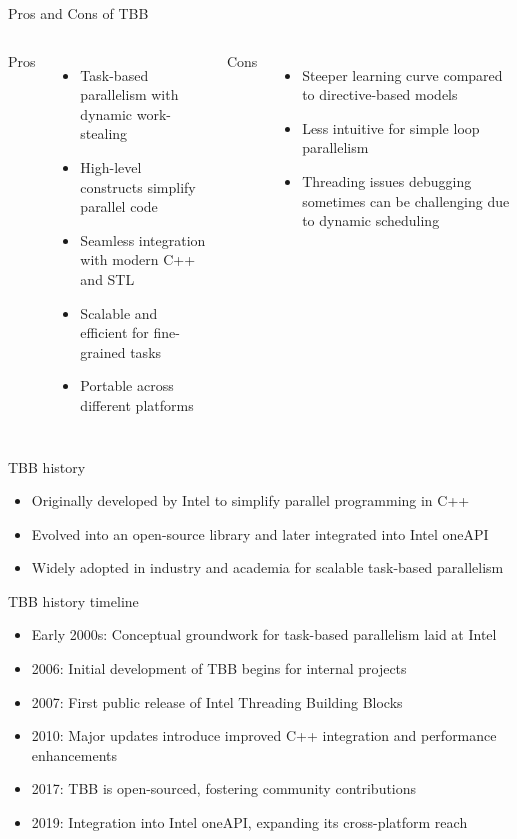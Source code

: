 \documentclass{beamer}
\begin{document}
\begin{frame}{Pros and Cons of TBB}
  \begin{columns}
      Pros
      \begin{itemize}
        \item Task-based parallelism with dynamic work-stealing
        \item High-level constructs simplify parallel code
        \item Seamless integration with modern C++ and STL
        \item Scalable and efficient for fine-grained tasks
        \item Portable across different platforms
      \end{itemize}
      Cons
      \begin{itemize}
        \item Steeper learning curve compared to directive-based models
        \item Less intuitive for simple loop parallelism
        \item Threading issues debugging sometimes can be challenging due to dynamic scheduling
      \end{itemize}
  \end{columns}
\end{frame}

\begin{frame}{TBB history}
  \begin{itemize}
    \item Originally developed by Intel to simplify parallel programming in C++
    \item Evolved into an open-source library and later integrated into Intel oneAPI
    \item Widely adopted in industry and academia for scalable task-based parallelism
  \end{itemize}
\end{frame}

\begin{frame}{TBB history timeline}
  \begin{itemize}
    \item Early 2000s: Conceptual groundwork for task-based parallelism laid at Intel
    \item 2006: Initial development of TBB begins for internal projects
    \item 2007: First public release of Intel Threading Building Blocks
    \item 2010: Major updates introduce improved C++ integration and performance enhancements
    \item 2017: TBB is open-sourced, fostering community contributions
    \item 2019: Integration into Intel oneAPI, expanding its cross-platform reach
  \end{itemize}
\end{frame}
\end{document}
